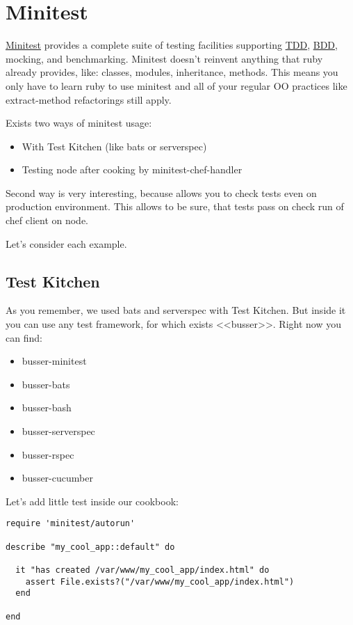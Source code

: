 \section{Minitest}
\label{sec:testing-minitest}

\href{https://github.com/seattlerb/minitest}{Minitest} provides a complete suite of testing facilities supporting \href{http://en.wikipedia.org/wiki/Test-driven\_development}{TDD}, \href{http://en.wikipedia.org/wiki/Behavior-driven\_development}{BDD}, mocking, and benchmarking. Minitest doesn't reinvent anything that ruby already provides, like: classes, modules, inheritance, methods. This means you only have to learn ruby to use minitest and all of your regular OO practices like extract-method refactorings still apply.

Exists two ways of minitest usage:

\begin{itemize}
  \item With Test Kitchen (like bats or serverspec)
  \item Testing node after cooking by minitest-chef-handler
\end{itemize}

Second way is very interesting, because allows you to check tests even on production environment. This allows to be sure, that tests pass on check run of chef client on node.

Let's consider each example.

\subsection{Test Kitchen}

As you remember, we used bats and serverspec with Test Kitchen. But inside it you can use any test framework, for which exists <<busser>>. Right now you can find:

\begin{itemize}
  \item busser-minitest
  \item busser-bats
  \item busser-bash
  \item busser-serverspec
  \item busser-rspec
  \item busser-cucumber
\end{itemize}

Let's add little test inside our cookbook:

\begin{lstlisting}[label=lst:testing-minitest1]
require 'minitest/autorun'

describe "my_cool_app::default" do

  it "has created /var/www/my_cool_app/index.html" do
    assert File.exists?("/var/www/my_cool_app/index.html")
  end

end
\end{lstlisting}


